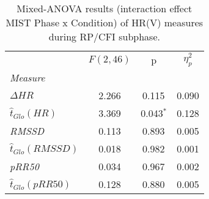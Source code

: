 \begin{table}[th!]
\centering
\caption{Mixed-ANOVA results (interaction effect MIST Phase x Condition) of HR(V) measures during RP/CFI subphase.}
\label{tab:cft_mist_interaction_rp_cfi}

\begin{tabular}{l||SSS}
\toprule
{} & {$F(2, 46)$} &          {p} & {$\eta^2_p$} \\
\textit{Measure}                &              &              &              \\
\midrule
\textit{$\Delta HR$}            &        2.266 &   0.115$^{}$ &        0.090 \\
\textit{$\hat{t}_{Glo}(HR)$}    &        3.369 &  0.043$^{*}$ &        0.128 \\
\textit{RMSSD}                  &        0.113 &   0.893$^{}$ &        0.005 \\
\textit{$\hat{t}_{Glo}(RMSSD)$} &        0.018 &   0.982$^{}$ &        0.001 \\
\textit{pRR50}                  &        0.034 &   0.967$^{}$ &        0.002 \\
\textit{$\hat{t}_{Glo}(pRR50)$} &        0.128 &   0.880$^{}$ &        0.005 \\
\bottomrule
\end{tabular}
\end{table}
